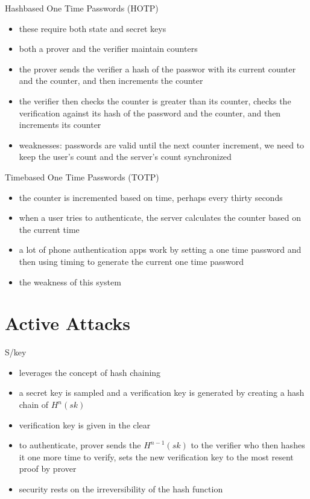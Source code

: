 \documentclass[handout]{beamer}
\begin{document}
\begin{frame}{Hashbased One Time Passwords (HOTP)}
  \begin{itemize}
    \item \pause these require both state and secret keys
    \item \pause both a prover and the verifier maintain counters
    \item \pause the prover sends the verifier a hash of the passwor with its current counter and the counter, and then increments the counter
    \item \pause the verifier then checks the counter is greater than its counter, checks the verification against its hash of the password and the counter, and then increments its counter
    \item \pause weaknesses: passwords are valid until the next counter increment, we need to keep the user's count and the server's count synchronized
  \end{itemize}
\end{frame}

\begin{frame}{Timebased One Time Passwords (TOTP)}
  \begin{itemize}
    \item \pause the counter is incremented based on time, perhaps every thirty seconds
    \item \pause when a user tries to authenticate, the server calculates the counter based on the current time
    \item \pause a lot of phone authentication apps work by setting a one time password and then using timing to generate the current one time password
    \item \pause the weakness of this system
  \end{itemize}
\end{frame}

\section{Active Attacks}

\begin{frame}{S/key}
  \begin{itemize}
    \item \pause leverages the concept of hash chaining
    \item \pause a secret key is sampled and a verification key is generated by creating a hash chain of \(H^n(sk)\)
    \item \pause verification key is given in the clear
    \item \pause to authenticate, prover sends the \(H^{n-1}(sk)\) to the verifier who then hashes it one more time to verify, sets the new verification key to the most resent proof by prover
    \item \pause security rests on the irreversibility of the hash function
  \end{itemize}
\end{frame}
\end{document}
